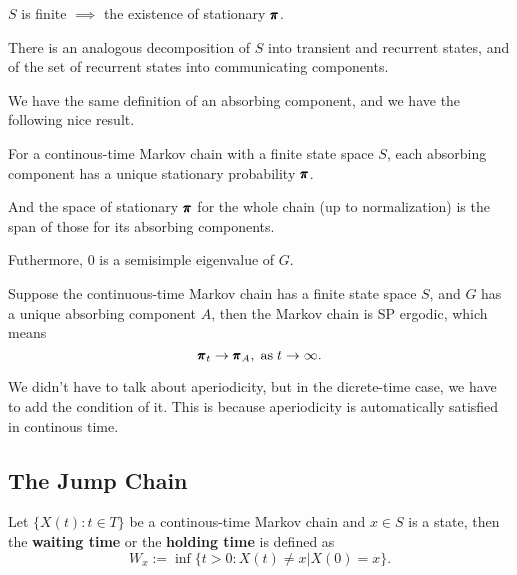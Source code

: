 \begin{proposition}
    $S$ is finite $\implies$ the existence of stationary $\pmb{\pi}$.
\end{proposition}

There is an analogous decomposition of $S$ into transient and recurrent states, and of the set of recurrent states into communicating components.

We have the same definition of an absorbing component, and we have the following nice result.

\begin{proposition}
    For a continous-time Markov chain with a finite state space $S$, each absorbing component has a unique stationary probability $\pmb{\pi}$.
    
    And the space of stationary $\pmb{\pi}$ for the whole chain (up to normalization) is the span of those for its absorbing components.

    Futhermore, $0$ is a semisimple eigenvalue of $G$.
\end{proposition}

\begin{theorem}
    Suppose the continuous-time Markov chain has a finite state space $S$, and $G$ has a unique absorbing component $A$, then the Markov chain is SP ergodic, which means 
    \begin{equation*}
        \pmb{\pi}_t \to \pmb{\pi}_A, \; \text{as} \; t \to \infty.
    \end{equation*}
\end{theorem}

\begin{remark}
    We didn't have to talk about aperiodicity, but in the dicrete-time case, we have to add the condition of it. This is because aperiodicity is automatically satisfied in continous time.
\end{remark}

\subsection{The Jump Chain}

\begin{definition}
    Let $\{X(t): t \in T\}$ be a continous-time Markov chain and $x \in S$ is a state, then the \textbf{waiting time} or the \textbf{holding time} is defined as
    \begin{equation*}
        W_x := \inf \{ t > 0 : X(t) \neq x | X(0) = x \}.
    \end{equation*}
\end{definition}

